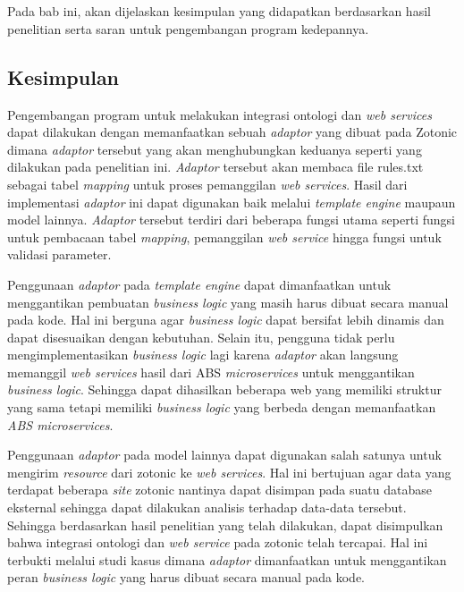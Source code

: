 \chapter{\babEnam}
Pada bab ini, akan dijelaskan kesimpulan yang didapatkan berdasarkan hasil penelitian serta saran untuk pengembangan program kedepannya.
\section{Kesimpulan}
Pengembangan program untuk melakukan integrasi ontologi dan \textit{web services} dapat dilakukan dengan memanfaatkan sebuah \textit{adaptor} yang dibuat pada Zotonic dimana \textit{adaptor} tersebut yang akan menghubungkan keduanya seperti yang dilakukan pada penelitian ini. \textit{Adaptor} tersebut akan membaca file rules.txt sebagai tabel \textit{mapping} untuk proses pemanggilan \textit{web services}. Hasil dari implementasi \textit{adaptor} ini dapat digunakan baik melalui \textit{template engine} maupaun model lainnya. \textit{Adaptor} tersebut terdiri dari beberapa fungsi utama seperti fungsi untuk pembacaan tabel \textit{mapping}, pemanggilan \textit{web service} hingga fungsi untuk validasi parameter.

Penggunaan \textit{adaptor} pada \textit{template engine} dapat dimanfaatkan untuk menggantikan pembuatan \textit{business logic} yang masih harus dibuat secara manual pada kode. Hal ini berguna agar \textit{business logic} dapat bersifat lebih dinamis dan dapat disesuaikan dengan kebutuhan. Selain itu, pengguna tidak perlu mengimplementasikan \textit{business logic} lagi karena \textit{adaptor} akan langsung memanggil \textit{web services} hasil dari ABS \textit{microservices} untuk menggantikan \textit{business logic}. Sehingga dapat dihasilkan beberapa web yang memiliki struktur yang sama tetapi memiliki \textit{business logic} yang berbeda dengan memanfaatkan \textit{ABS microservices}.

Penggunaan \textit{adaptor} pada model lainnya dapat digunakan salah satunya untuk mengirim \textit{resource} dari zotonic ke \textit{web services}. Hal ini bertujuan agar data yang terdapat beberapa \textit{site} zotonic nantinya dapat disimpan pada suatu database eksternal sehingga dapat dilakukan analisis terhadap data-data tersebut. Sehingga berdasarkan hasil penelitian yang telah dilakukan, dapat disimpulkan bahwa integrasi ontologi dan \textit{web service} pada zotonic telah tercapai. Hal ini terbukti melalui studi kasus dimana \textit{adaptor} dimanfaatkan untuk menggantikan peran \textit{business logic} yang harus dibuat secara manual pada kode.
